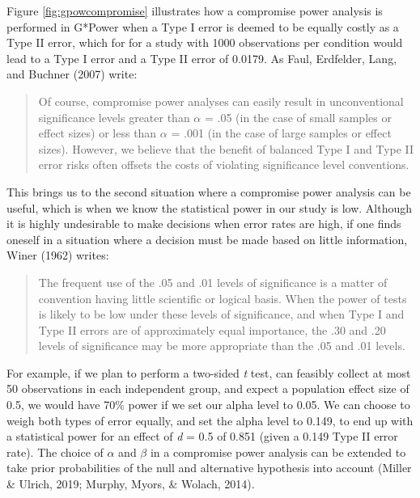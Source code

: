 \documentclass[
  english,
  ,jou, a4paper,floatsintext]{apa6}
\begin{document}
Figure \ref{fig:gpowcompromise} illustrates how a compromise power analysis is performed in G*Power when a Type I error is deemed to be equally costly as a Type II error, which for for a study with 1000 observations per condition would lead to a Type I error and a Type II error of 0.0179. As Faul, Erdfelder, Lang, and Buchner (2007) write:

\begin{quote}
Of course, compromise power analyses can easily result in unconventional significance levels greater than \(\alpha\) = .05 (in the case of small samples or effect sizes) or less than \(\alpha\) = .001 (in the case of large samples or effect sizes). However, we believe that the benefit of balanced Type I and Type II error risks often offsets the costs of violating significance level conventions.
\end{quote}

This brings us to the second situation where a compromise power analysis can be useful, which is when we know the statistical power in our study is low. Although it is highly undesirable to make decisions when error rates are high, if one finds oneself in a situation where a decision must be made based on little information, Winer (1962) writes:

\begin{quote}
The frequent use of the .05 and .01 levels of significance is a matter of convention having little scientific or logical basis. When the power of tests is likely to be low under these levels of significance, and when Type I and Type II errors are of approximately equal importance, the .30 and .20 levels of significance may be more appropriate than the .05 and .01 levels.
\end{quote}

For example, if we plan to perform a two-sided \emph{t} test, can feasibly collect at most 50 observations in each independent group, and expect a population effect size of 0.5, we would have 70\% power if we set our alpha level to 0.05. We can choose to weigh both types of error equally, and set the alpha level to 0.149, to end up with a statistical power for an effect of \emph{d} = 0.5 of 0.851 (given a 0.149 Type II error rate). The choice of \(\alpha\) and \(\beta\) in a compromise power analysis can be extended to take prior probabilities of the null and alternative hypothesis into account (Miller \& Ulrich, 2019; Murphy, Myors, \& Wolach, 2014).
\end{document}
